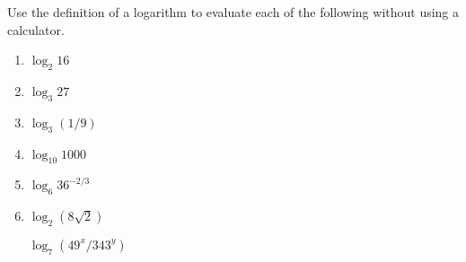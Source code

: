Use the definition of a logarithm to evaluate each of the following without using a calculator.  

\begin{enumerate}
\item   $\log_2 16$

\item   $\log_3 27$

\item   $\log_3 (1/9)$

\item   $\log_{10} 1000$

\item   $\log_{6} 36^{-2/3}$

\item   $\log_{2} (8\sqrt{2})$

 $\log_7(49^x/343^y)$

%


\end{enumerate}

